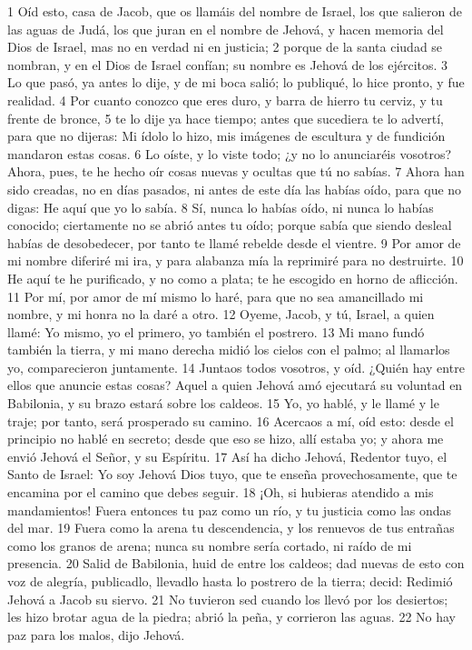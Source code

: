 1 Oíd esto, casa de Jacob, que os llamáis del nombre de Israel, los que salieron de las aguas de Judá, los que juran en el nombre de Jehová, y hacen memoria del Dios de Israel, mas no en verdad ni en justicia;
2 porque de la santa ciudad se nombran, y en el Dios de Israel confían; su nombre es Jehová de los ejércitos.
3 Lo que pasó, ya antes lo dije, y de mi boca salió; lo publiqué, lo hice pronto, y fue realidad.
4 Por cuanto conozco que eres duro, y barra de hierro tu cerviz, y tu frente de bronce,
5 te lo dije ya hace tiempo; antes que sucediera te lo advertí, para que no dijeras: Mi ídolo lo hizo, mis imágenes de escultura y de fundición mandaron estas cosas.
6 Lo oíste, y lo viste todo; ¿y no lo anunciaréis vosotros? Ahora, pues, te he hecho oír cosas nuevas y ocultas que tú no sabías.
7 Ahora han sido creadas, no en días pasados, ni antes de este día las habías oído, para que no digas: He aquí que yo lo sabía.
8 Sí, nunca lo habías oído, ni nunca lo habías conocido; ciertamente no se abrió antes tu oído; porque sabía que siendo desleal habías de desobedecer, por tanto te llamé rebelde desde el vientre.
9 Por amor de mi nombre diferiré mi ira, y para alabanza mía la reprimiré para no destruirte.
10 He aquí te he purificado, y no como a plata; te he escogido en horno de aflicción.
11 Por mí, por amor de mí mismo lo haré, para que no sea amancillado mi nombre, y mi honra no la daré a otro. 
12 Oyeme, Jacob, y tú, Israel, a quien llamé: Yo mismo, yo el primero, yo también el postrero. 
13 Mi mano fundó también la tierra, y mi mano derecha midió los cielos con el palmo; al llamarlos yo, comparecieron juntamente.
14 Juntaos todos vosotros, y oíd. ¿Quién hay entre ellos que anuncie estas cosas? Aquel a quien Jehová amó ejecutará su voluntad en Babilonia, y su brazo estará sobre los caldeos.
15 Yo, yo hablé, y le llamé y le traje; por tanto, será prosperado su camino.
16 Acercaos a mí, oíd esto: desde el principio no hablé en secreto; desde que eso se hizo, allí estaba yo; y ahora me envió Jehová el Señor, y su Espíritu.
17 Así ha dicho Jehová, Redentor tuyo, el Santo de Israel: Yo soy Jehová Dios tuyo, que te enseña provechosamente, que te encamina por el camino que debes seguir.
18 ¡Oh, si hubieras atendido a mis mandamientos! Fuera entonces tu paz como un río, y tu justicia como las ondas del mar.
19 Fuera como la arena tu descendencia, y los renuevos de tus entrañas como los granos de arena; nunca su nombre sería cortado, ni raído de mi presencia.
20 Salid de Babilonia, huid de entre los caldeos; dad nuevas de esto con voz de alegría, publicadlo, llevadlo hasta lo postrero de la tierra; decid: Redimió Jehová a Jacob su siervo.
21 No tuvieron sed cuando los llevó por los desiertos; les hizo brotar agua de la piedra; abrió la peña, y corrieron las aguas.
22 No hay paz para los malos, dijo Jehová. 

